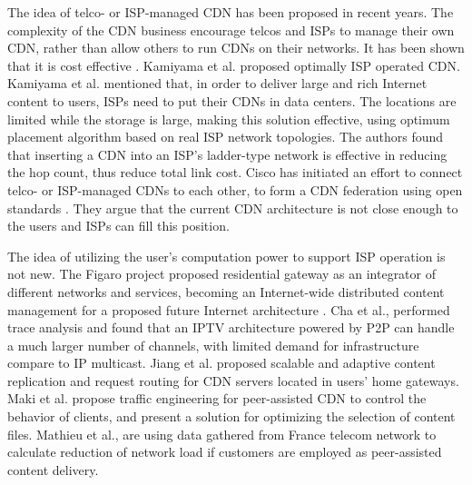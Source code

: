 \documentclass[conference]{IEEEtran}
\begin{document}
The idea of telco- or ISP-managed CDN has been proposed in recent years.  
The complexity of the CDN business encourage telcos and ISPs to manage their own CDN, rather than allow others to run CDNs on their networks.  
It has been shown that it is cost effective \cite{federation}\cite{norton2011internet}. 
Kamiyama et al. \cite{NoriakiKAMIYAMA2013} proposed optimally ISP operated CDN.
Kamiyama et al. mentioned that, in order to deliver large and rich Internet content to users, ISPs need to put their CDNs in data centers.  
The locations are limited while the storage is large, making this solution effective, using optimum placement algorithm based on real ISP network topologies.  
The authors found that inserting a CDN into an ISP's ladder-type network is effective in reducing the hop count, thus reduce total link cost.  
Cisco has initiated an effort to connect telco- or ISP-managed CDNs to each other, to form a CDN federation \cite{federation} using open standards \cite{cdni}.  
They argue that the current CDN architecture is not close enough to the users and ISPs can fill this position.

The idea of utilizing the user's computation power to support ISP operation is not new.  
The Figaro project \cite{figaro} proposed residential gateway as an integrator of different networks and services, becoming an Internet-wide distributed content management for a proposed future Internet architecture \cite{figaro}.  
Cha et al.,\cite{Cha:2008:NTP:1855641.1855646} performed trace analysis and found that an IPTV architecture powered by P2P can handle a much larger number of channels, with limited demand for infrastructure compare to IP multicast.  
Jiang et al. \cite{Jiang:2012:OMD:2413176.2413193} proposed scalable and adaptive content replication and request routing for CDN servers located in users' home gateways.  
Maki et al.\cite{NaoyaMAKI2012} propose traffic engineering for peer-assisted CDN to control the behavior of clients, and present a solution for optimizing the selection of content files.
Mathieu et al., \cite{6249305} are using data gathered from France telecom network to calculate reduction of network load if customers are employed as peer-assisted content delivery.
\end{document}
